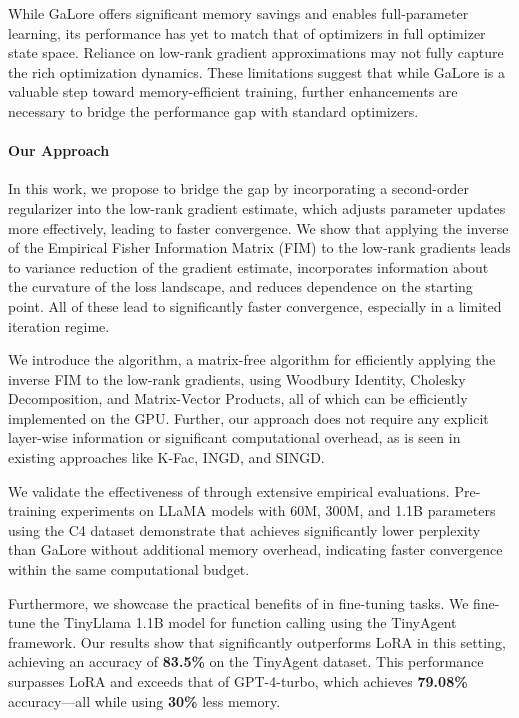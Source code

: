 While GaLore offers significant memory savings and enables full-parameter learning, its performance has yet to match that of optimizers in full optimizer state space. Reliance on low-rank gradient approximations may not fully capture the rich optimization dynamics. These limitations suggest that while GaLore is a valuable step toward memory-efficient training, further enhancements are necessary to bridge the performance gap with standard optimizers.

\paragraph{Our Approach}

In this work, we propose to bridge the gap by incorporating a second-order regularizer into the low-rank gradient estimate, which adjusts parameter updates more effectively, leading to faster convergence. We show that applying the inverse of the Empirical Fisher Information Matrix (FIM) to the low-rank gradients leads to variance reduction of the gradient estimate, incorporates information about the curvature of the loss landscape, and reduces dependence on the starting point. All of these lead to significantly faster convergence, especially in a limited iteration regime.

We introduce the \lowrank algorithm, a matrix-free algorithm for efficiently applying the inverse FIM to the low-rank gradients, using Woodbury Identity, Cholesky Decomposition, and Matrix-Vector Products, all of which can be efficiently implemented on the GPU. Further, our approach does not require any explicit layer-wise information or significant computational overhead, as is seen in existing approaches like K-Fac, INGD, and SINGD.

 We validate the effectiveness of \lowrank through extensive empirical evaluations. Pre-training experiments on LLaMA models with 60M, 300M, and 1.1B parameters using the C4 dataset demonstrate that \lowrank achieves significantly lower perplexity than GaLore without additional memory overhead, indicating faster convergence within the same computational budget.

 Furthermore, we showcase the practical benefits of \lowrank in fine-tuning tasks. We fine-tune the TinyLlama 1.1B model for function calling using the TinyAgent framework. Our results show that \lowrank significantly outperforms LoRA in this setting, achieving an accuracy of \textbf{83.5\%} on the TinyAgent dataset. This performance surpasses LoRA and exceeds that of GPT-4-turbo, which achieves \textbf{79.08\%} accuracy—all while using \textbf{30\%} less memory.




